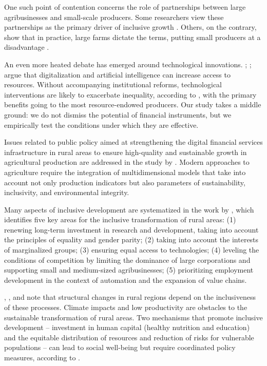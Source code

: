 ﻿\documentclass[pdflatex,sn-mathphys-ay]{sn-jnl}
\begin{document}
One such point of contention concerns the role of partnerships between
large agribusinesses and small-scale producers. Some researchers view
these partnerships as the primary driver of inclusive growth
\citep{ref34,ref90}. Others, on the
contrary, show that in practice, large farms dictate the terms, putting
small producers at a disadvantage \citep{ref90}.

An even more heated debate has emerged around technological innovations.
\citet{ref105}; \citet{ref72}; \citep{ref43,ref37,ref104} argue that digitalization and
artificial intelligence can increase access to resources. Without
accompanying institutional reforms, technological interventions are
likely to exacerbate inequality, according to \citet{ref28},
with the primary benefits going to the most resource-endowed producers.
Our study takes a middle ground: we do not dismiss the potential of
financial instruments, but we empirically test the conditions under
which they are effective.

Issues related to public policy aimed at strengthening the digital
financial services infrastructure in rural areas to ensure high-quality
and sustainable growth in agricultural production are addressed in the
study by \citet{ref38}. Modern approaches to agriculture
require the integration of multidimensional models that take into
account not only production indicators but also parameters of
sustainability, inclusivity, and environmental integrity.

Many aspects of inclusive development are systematized in the work
by \citet{ref55}, which identifies five key areas for the
inclusive transformation of rural areas: (1) renewing long-term
investment in research and development, taking into account the
principles of equality and gender parity; (2) taking into account the
interests of marginalized groups; (3) ensuring equal access to
technologies; (4) leveling the conditions of competition by limiting the
dominance of large corporations and supporting small and medium-sized
agribusinesses; (5) prioritizing employment development in the context
of automation and the expansion of value chains.

\citet{ref47}, \citet{ref64}, and \citet{ref96} note that structural changes in rural
regions depend on the inclusiveness of these processes. Climate impacts
and low productivity are obstacles to the sustainable transformation of
rural areas. Two mechanisms that promote inclusive development --
investment in human capital (healthy nutrition and education) and the
equitable distribution of resources and reduction of risks for
vulnerable populations -- can lead to social well-being but require
coordinated policy measures, according to \citet{ref21}.
\end{document}
